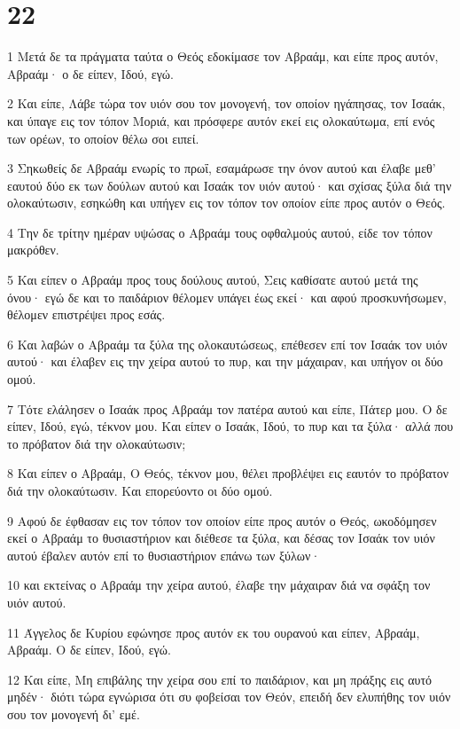 \chapter{22}

\par 1 Μετά δε τα πράγματα ταύτα ο Θεός εδοκίμασε τον Αβραάμ, και είπε προς αυτόν, Αβραάμ· ο δε είπεν, Ιδού, εγώ.
\par 2 Και είπε, Λάβε τώρα τον υιόν σου τον μονογενή, τον οποίον ηγάπησας, τον Ισαάκ, και ύπαγε εις τον τόπον Μοριά, και πρόσφερε αυτόν εκεί εις ολοκαύτωμα, επί ενός των ορέων, το οποίον θέλω σοι ειπεί.
\par 3 Σηκωθείς δε Αβραάμ ενωρίς το πρωΐ, εσαμάρωσε την όνον αυτού και έλαβε μεθ' εαυτού δύο εκ των δούλων αυτού και Ισαάκ τον υιόν αυτού· και σχίσας ξύλα διά την ολοκαύτωσιν, εσηκώθη και υπήγεν εις τον τόπον τον οποίον είπε προς αυτόν ο Θεός.
\par 4 Την δε τρίτην ημέραν υψώσας ο Αβραάμ τους οφθαλμούς αυτού, είδε τον τόπον μακρόθεν.
\par 5 Και είπεν ο Αβραάμ προς τους δούλους αυτού, Σεις καθίσατε αυτού μετά της όνου· εγώ δε και το παιδάριον θέλομεν υπάγει έως εκεί· και αφού προσκυνήσωμεν, θέλομεν επιστρέψει προς εσάς.
\par 6 Και λαβών ο Αβραάμ τα ξύλα της ολοκαυτώσεως, επέθεσεν επί τον Ισαάκ τον υιόν αυτού· και έλαβεν εις την χείρα αυτού το πυρ, και την μάχαιραν, και υπήγον οι δύο ομού.
\par 7 Τότε ελάλησεν ο Ισαάκ προς Αβραάμ τον πατέρα αυτού και είπε, Πάτερ μου. Ο δε είπεν, Ιδού, εγώ, τέκνον μου. Και είπεν ο Ισαάκ, Ιδού, το πυρ και τα ξύλα· αλλά που το πρόβατον διά την ολοκαύτωσιν;
\par 8 Και είπεν ο Αβραάμ, Ο Θεός, τέκνον μου, θέλει προβλέψει εις εαυτόν το πρόβατον διά την ολοκαύτωσιν. Και επορεύοντο οι δύο ομού.
\par 9 Αφού δε έφθασαν εις τον τόπον τον οποίον είπε προς αυτόν ο Θεός, ωκοδόμησεν εκεί ο Αβραάμ το θυσιαστήριον και διέθεσε τα ξύλα, και δέσας τον Ισαάκ τον υιόν αυτού έβαλεν αυτόν επί το θυσιαστήριον επάνω των ξύλων·
\par 10 και εκτείνας ο Αβραάμ την χείρα αυτού, έλαβε την μάχαιραν διά να σφάξη τον υιόν αυτού.
\par 11 Άγγελος δε Κυρίου εφώνησε προς αυτόν εκ του ουρανού και είπεν, Αβραάμ, Αβραάμ. Ο δε είπεν, Ιδού, εγώ.
\par 12 Και είπε, Μη επιβάλης την χείρα σου επί το παιδάριον, και μη πράξης εις αυτό μηδέν· διότι τώρα εγνώρισα ότι συ φοβείσαι τον Θεόν, επειδή δεν ελυπήθης τον υιόν σου τον μονογενή δι' εμέ.
